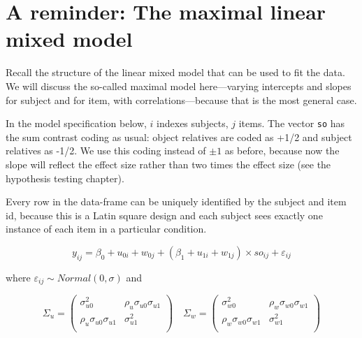 \documentclass[12pt,]{krantz}
\begin{document}
\hypertarget{a-reminder-the-maximal-linear-mixed-model}{%
\section{A reminder: The maximal linear mixed model}\label{a-reminder-the-maximal-linear-mixed-model}}

Recall the structure of the linear mixed model that can be used to fit the \citet{grodner} data. We will discuss the so-called maximal model here---varying intercepts and slopes for subject and for item, with correlations---because that is the most general case.

In the model specification below, \(i\) indexes subjects, \(j\) items. The vector \texttt{so} has the sum contrast coding as usual: object relatives are coded as +1/2 and subject relatives as -1/2. We use this coding instead of \(\pm 1\) as before, because now the slope will reflect the effect size rather than two times the effect size (see the hypothesis testing chapter).

Every row in the data-frame can be uniquely identified by the subject and item id, because this is a Latin square design and each subject sees exactly one instance of each item in a particular condition.

\begin{equation}
y_{ij} = \beta_0 + u_{0i} + w_{0j} + (\beta_1 + u_{1i} + w_{1j}) \times so_{ij} + \varepsilon_{ij}
\end{equation}

where \(\varepsilon_{ij} \sim Normal(0,\sigma)\) and

\begin{equation}\label{eq:covmatsimulations}
\Sigma_u
=
\begin{pmatrix}
\sigma _{u0}^2  & \rho _{u}\sigma _{u0}\sigma _{u1}\\
\rho _{u}\sigma _{u0}\sigma _{u1}    & \sigma _{u1}^2\\
\end{pmatrix}
\quad 
\Sigma _w
=
\begin{pmatrix}
\sigma _{w0}^2  & \rho _{w}\sigma _{w0}\sigma _{w1}\\
\rho _{w}\sigma _{w0}\sigma _{w1}    & \sigma _{w1}^2\\
\end{pmatrix}
\end{equation}
\end{document}
